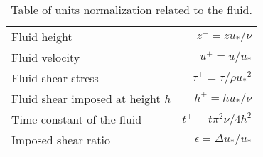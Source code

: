 \begin{table}
    \centering
    \begin{tabular}{l r}
        \hline
        Fluid height & $z^+ = zu_*/\nu$ \\
        Fluid velocity & $u^+ = u/u_*$ \\
        Fluid shear stress & $\tau^+ = \tau/\rho {u_*}^2$ \\
        Fluid shear imposed at height $h$ & $h^+ = hu_*/\nu$ \\
        Time constant of the fluid & $t^+ = t\pi^2\nu/4h^2$ \\
        Imposed shear ratio & $\epsilon = \Delta u_*/u_*$ \\
        \hline \hline
    \end{tabular}
    \caption{Table of units normalization related to the fluid.}
    \label{tab:units}
\end{table}

